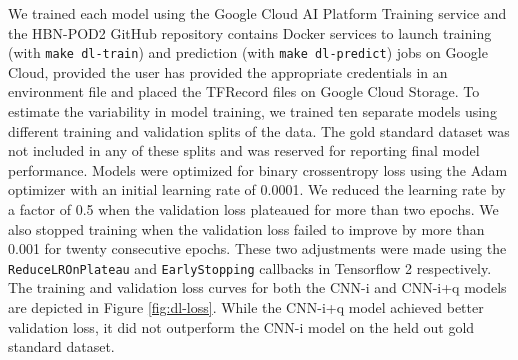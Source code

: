 \documentclass[fleqn,10pt]{wlscirep}
\begin{document}
We trained each model using the Google Cloud AI Platform Training service and
the HBN-POD2 GitHub repository contains Docker services to launch training (with
\texttt{make dl-train}) and prediction (with \texttt{make dl-predict}) jobs on
Google Cloud, provided the user has provided the appropriate credentials in an
environment file and placed the TFRecord files on Google Cloud Storage. To
estimate the variability in model training, we trained ten separate models using
different training and validation splits of the data. The gold standard dataset
was not included in any of these splits and was reserved for reporting final
model performance. Models were optimized for binary crossentropy loss using the
Adam optimizer \cite{kingma2017adam} with an initial learning rate of 0.0001. We
reduced the learning rate by a factor of 0.5 when the validation loss plateaued
for more than two epochs. We also stopped training when the validation loss
failed to improve by more than 0.001 for twenty consecutive epochs.  These two
adjustments were made using the \texttt{ReduceLROnPlateau} and
\texttt{EarlyStopping} callbacks in Tensorflow 2 \cite{tensorflow} respectively.
The training and validation loss curves for both the CNN-i and CNN-i+q models
are depicted in Figure \ref{fig:dl-loss}. While the CNN-i+q model achieved
better validation loss, it did not outperform the CNN-i model on the held out
gold standard dataset.
\end{document}
